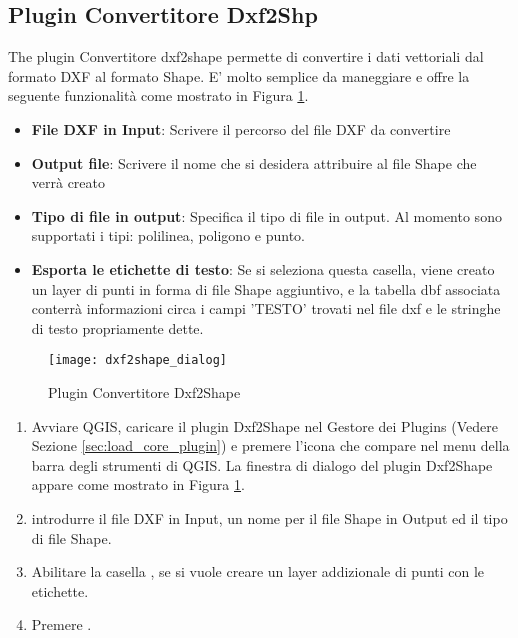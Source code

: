 
\subsection{Plugin Convertitore Dxf2Shp}


The plugin Convertitore dxf2shape permette di convertire i dati vettoriali dal formato DXF al formato Shape. E' molto semplice da maneggiare e offre la seguente funzionalità come mostrato in Figura \ref{fig:dxf2shape_dialog}.

\begin{itemize}
\item \textbf{File DXF in Input}: Scrivere il percorso del file DXF da convertire
\item \textbf{Output file}: Scrivere il nome che si desidera attribuire al file Shape che verrà creato
\item \textbf{Tipo di file in output}: Specifica il tipo di file in output. Al momento sono supportati i tipi: polilinea, poligono e punto.
\item \textbf{Esporta le etichette di testo}: Se si seleziona questa casella, viene creato un layer di punti in forma di file Shape aggiuntivo, e la tabella dbf associata conterrà informazioni circa i campi 'TESTO' trovati nel file dxf e le stringhe di testo propriamente dette.
\end{itemize}

\begin{figure}[ht]
   \begin{center}
   \caption{Plugin Convertitore Dxf2Shape \nixcaption}\label{fig:dxf2shape_dialog}\smallskip
   \texttt{[image: dxf2shape\_dialog]}
\end{center}  
\end{figure}

\begin{enumerate}
  \item Avviare QGIS, caricare il plugin Dxf2Shape nel Gestore dei Plugins (Vedere Sezione \ref{sec:load_core_plugin}) e premere l'icona  che compare nel menu della barra degli strumenti di QGIS. La finestra di dialogo del plugin Dxf2Shape appare come mostrato in Figura \ref{fig:dxf2shape_dialog}.
  \item introdurre il file DXF in Input, un  nome per il file Shape in Output ed il tipo di file Shape.
  \item Abilitare la casella , se si vuole creare un layer addizionale di punti con le etichette.
  \item Premere . 
\end{enumerate}

\newpage



